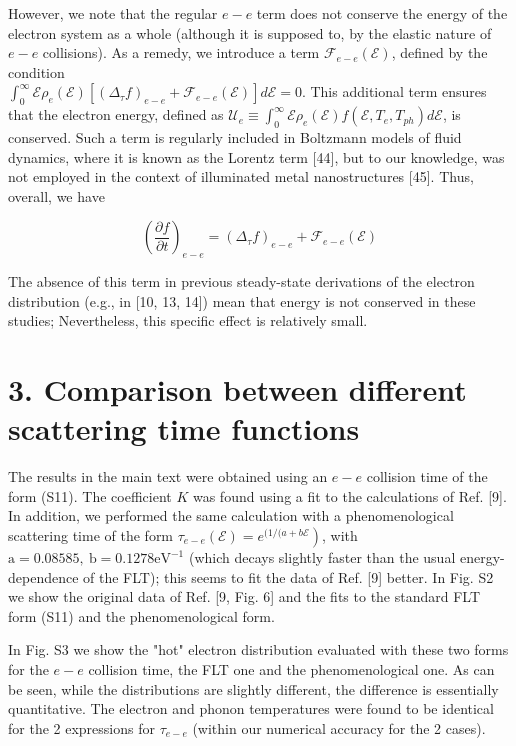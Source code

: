 \documentclass[10pt]{article}
\begin{document}
However, we note that the regular $e-e$ term does not conserve the energy of the electron system as a whole (although it is supposed to, by the elastic nature of $e- e$ collisions). As a remedy, we introduce a term $\mathcal{F}_{e-e}(\mathcal{E})$, defined by the condition\\
$\int_{0}^{\infty} \mathcal{E} \rho_{e}(\mathcal{E})\left[\left(\Delta_{\tau} f\right)_{e-e}+\mathcal{F}_{e-e}(\mathcal{E})\right] d \mathcal{E}=0$. This additional term ensures that the electron energy, defined as $\mathcal{U}_{e} \equiv \int_{0}^{\infty} \mathcal{E} \rho_{e}(\mathcal{E}) f\left(\mathcal{E}, T_{e}, T_{p h}\right) d \mathcal{E}$, is conserved. Such a term is regularly included in Boltzmann models of fluid dynamics, where it is known as the Lorentz term [44], but to our knowledge, was not employed in the context of illuminated metal nanostructures [45]. Thus, overall, we have


\begin{equation*}
\left(\frac{\partial f}{\partial t}\right)_{e-e}=\left(\Delta_{\tau} f\right)_{e-e}+\mathcal{F}_{e-e}(\mathcal{E}) \tag{S13}
\end{equation*}


The absence of this term in previous steady-state derivations of the electron distribution (e.g., in [10, 13, 14]) mean that energy is not conserved in these studies; Nevertheless, this specific effect is relatively small.

\section*{3. Comparison between different scattering time functions}
The results in the main text were obtained using an $e-e$ collision time of the form (S11). The coefficient $K$ was found using a fit to the calculations of Ref. [9]. In addition, we performed the same calculation with a phenomenological scattering time of the form $\left.\tau_{e-e}(\mathcal{E})=e^{(1 /(a+b \mathcal{E}}\right)$, with $\mathrm{a}=0.08585, \mathrm{~b}=0.1278 \mathrm{eV}^{-1}$ (which decays slightly faster than the usual energy-dependence of the FLT); this seems to fit the data of Ref. [9] better. In Fig. S2 we show the original data of Ref. [9, Fig. 6] and the fits to the standard FLT form (S11) and the phenomenological form.

In Fig. S3 we show the "hot" electron distribution evaluated with these two forms for the $e-e$ collision time, the FLT one and the phenomenological one. As can be seen, while the distributions are slightly different, the difference is essentially quantitative. The electron and phonon temperatures were found to be identical for the 2 expressions for $\tau_{e-e}$ (within our numerical accuracy for the 2 cases).
\end{document}
